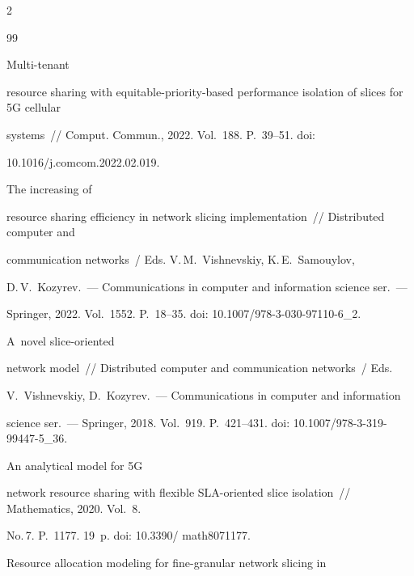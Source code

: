 \begin{multicols}{2}
{{\begin{thebibliography}{99}


 Multi-tenant 


resource sharing with equitable-priority-based performance isolation of slices for 5G cellular 


systems~// Comput. Commun., 2022. Vol.~188. P.~39--51. doi: 


10.1016/j.comcom.2022.02.019.







 The increasing of 


resource sharing efficiency in network slicing implementation~// Distributed computer and 


communication networks~/ Eds. V.\,M.~Vishnevskiy, K.\,E.~Samouylov, 


D.\,V.~Kozyrev.~--- Communications in computer and information science ser.~--- 


Springer, 2022. Vol.~1552. P.~18--35. doi: 10.1007/978-3-030-97110-6\_2.







 A~novel slice-oriented 


network model~// Distributed computer and communication networks~/ Eds. 


V.~Vishnevskiy, D.~Kozyrev.~--- Communications in computer and information 


science ser.~--- Springer, 2018. Vol.~919. P.~421--431. doi: 10.1007/978-3-319-99447-5\_36.




 An analytical model for 5G 


network resource sharing with flexible SLA-oriented slice isolation~// Mathematics, 2020. Vol.~8. 


No.\,7. P.~1177. 19~p. doi: 10.3390/ math8071177.







 Resource allocation modeling for fine-granular network slicing in 



\end{thebibliography}}}
\end{multicols}
